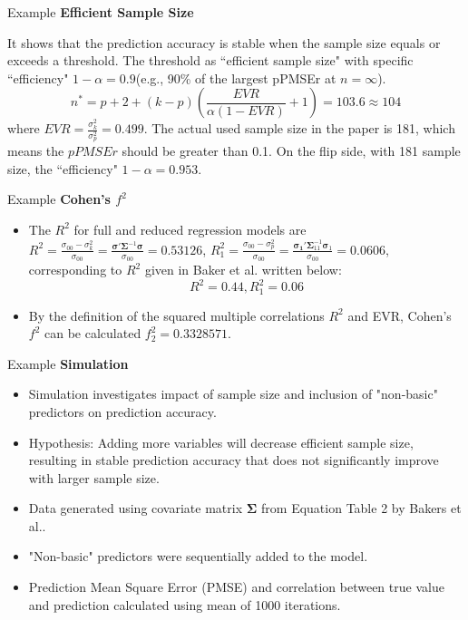 \documentclass{beamer}
\begin{document}
\begin{frame}{Example}
\textbf{Efficient Sample Size}

It shows that the prediction accuracy is stable when the sample size equals or exceeds a threshold. 
The threshold as ``efficient sample size" with specific ``efficiency" $1-\alpha = 0.9$(e.g., 90\% of the largest pPMSEr at $n=\infty$). 
$$
n^* = p+2+(k-p)\left(\frac{EVR}{\alpha(1-EVR)}+1\right) = 103.6\approx 104
$$
where $EVR = \frac{\sigma_k^2}{\sigma_p^2}=0.499$.
The actual used sample size in the paper is 181, which means the $pPMSEr$ should be greater than 0.1. On the flip side, with 181 sample size, the ``efficiency" $1-\alpha = 0.953$. \end{frame}

\begin{frame}{Example}
\textbf{Cohen's $f^2$}
\begin{itemize}
\item The $R^2$ for full and reduced regression models are 
$R^2 = \frac{\sigma_{00}-\sigma^2_k}{\sigma_{00}} = \frac{\boldsymbol{\sigma}' \boldsymbol{\Sigma}^{-1} \boldsymbol{\sigma}}{\sigma_{00}} = 0.53126$, $R_1^2 = \frac{\sigma_{00}-\sigma^2_p}{\sigma_{00}} = \frac{\boldsymbol{\sigma_1}' \boldsymbol{\Sigma}_{11}^{-1} \boldsymbol{\sigma}_1}{\sigma_{00}} = 0.0606$,
corresponding to $R^2$ given in Baker et al. written below:
$$R^2 = 0.44, R_1^2 = 0.06$$
\item By the definition of the squared multiple correlations $R^2$ and EVR, Cohen's $f^2$ can be calculated $f_2^2 = 0.3328571$.
\end{itemize}
\end{frame}

\begin{frame}{Example}
\textbf{Simulation}

\begin{itemize}
        \item Simulation investigates impact of sample size and inclusion of "non-basic" predictors on prediction accuracy.
        \item Hypothesis: Adding more variables will decrease efficient sample size, resulting in stable prediction accuracy that does not significantly improve with larger sample size.
        \item Data generated using covariate matrix $\boldsymbol{\Sigma}$ from Equation Table 2 by Bakers et al..
        \item "Non-basic" predictors were sequentially added to the model.
        \item Prediction Mean Square Error (PMSE) and correlation between true value and prediction calculated using mean of 1000 iterations.
    \end{itemize}
\end{frame}
\end{document}
